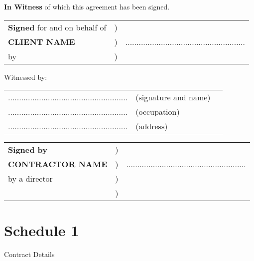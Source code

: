 \documentclass[a4paper,12pt]{article}
\newcommand{\contractorName}{CONTRACTOR NAME }
\newcommand{\clientName}{CLIENT NAME }
\begin{document}
\textbf{In Witness} of which this agreement has been signed.\newline
\newline
\begin{tabular}{lll}
\textbf{Signed} for and on behalf of & ) & \\
\textbf{\clientName} & ) & ...................................................... \\
by & ) & \\
\end{tabular}

Witnessed by:\newline
\newline
\begin{tabular}{lll}
...................................................... & (signature and name) & \\
...................................................... & (occupation) & \\
...................................................... & (address) & \\
\end{tabular}

\begin{tabular}{lll}
\textbf{Signed by}	& ) & \\
\textbf{\contractorName}	& ) & ...................................................... \\
by a director	& ) & \\
& ) & \\
\end{tabular}

\newpage
\part*{Schedule 1}
\begin{Large}
Contract Details
\end{Large}
\end{document}
